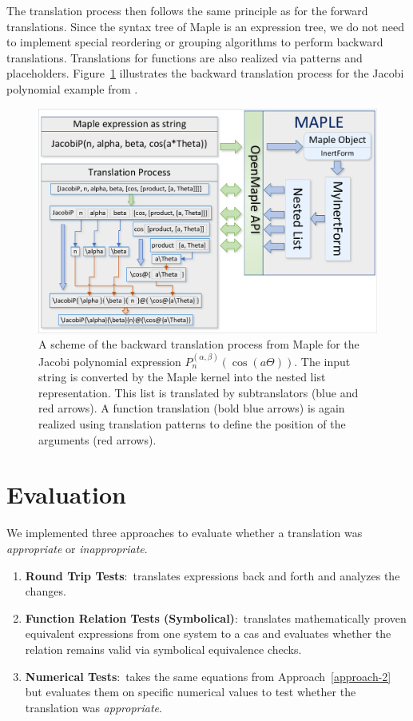 \documentclass[a4paper,11pt]{article}
\newcommand{\Maple}{Maple}
\theoremstyle{defTheoStyle}
\theoremstyle{defExampStyle}
\begin{document}
The translation process then follows the same principle as for the forward translations. Since the syntax tree of \Maple{} is an expression tree, we do not need to implement special reordering or grouping algorithms to perform backward translations. Translations for functions are also realized via patterns and placeholders. Figure~\ref{fig:backward-trans} illustrates the backward translation process for the Jacobi polynomial example from .

\begin{figure}[t!]
	\centering
	\includegraphics[clip, trim=0.1cm 0.1cm 0.1cm 0.1cm, scale=0.7]{MapleTranslation.pdf}
	\caption{A scheme of the backward translation process from \Maple{} for the Jacobi polynomial expression $P_n^{(\alpha , \beta)}(\cos(a\Theta))$. The input string is converted by the \Maple{} kernel into the nested list representation. This list is translated by subtranslators (blue and red arrows). A function translation (bold blue arrows) is again realized using translation patterns to define the position of the arguments (red arrows).}
	\label{fig:backward-trans}
\end{figure}
 
\section{Evaluation}\label{sec:evaluation}
We implemented three approaches to evaluate whether a translation was \textit{appropriate} or \textit{inappropriate}.
\begin{enumerate}
\item \textbf{Round Trip Tests}:~translates expressions back and forth and analyzes the changes.
\item\label{approach-2} \textbf{Function Relation Tests (Symbolical)}:~translates mathematically proven equivalent expressions from one system to a \gls*{cas} and evaluates whether the relation remains valid via symbolical equivalence checks.
\item \textbf{Numerical Tests}:~takes the same equations from Approach~\ref{approach-2} but evaluates them on specific numerical values to test whether the translation was {\it appropriate}.
\end{enumerate}
\end{document}
